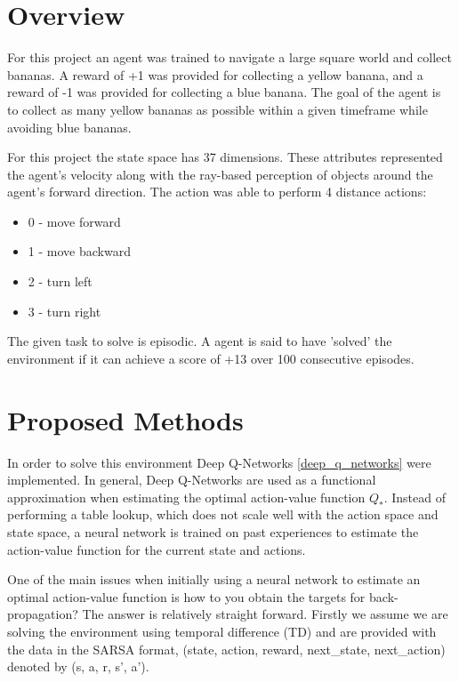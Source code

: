 \documentclass[12pt]{article}
\begin{document}
\maketitle

\section{Overview}
For this project an agent was trained to navigate a large square world and collect bananas.
A reward of +1 was provided for collecting a yellow banana, and a reward of -1 was provided for collecting a blue banana.
The goal of the agent is to collect as many yellow bananas as possible within a given timeframe while avoiding blue bananas.

For this project the state space has 37 dimensions. These attributes represented the agent's velocity along with the ray-based perception
of objects around the agent's forward direction.
The action was able to perform 4 distance actions:

\begin{itemize}
\item 0 - move forward
\item 1 - move backward
\item 2 - turn left
\item 3 - turn right
\end{itemize}

The given task to solve is episodic. 
A agent is said to have 'solved' the environment if it can achieve a score of +13 over 100 consecutive episodes.

\section{Proposed Methods}
\label{methods}
In order to solve this environment Deep Q-Networks \ref{deep_q_networks} were implemented.
In general, Deep Q-Networks are used as a functional approximation  when estimating the optimal action-value function $Q_*$.
Instead of performing a table lookup, which does not scale well with the action space and state space, a neural network is trained
on past experiences to estimate the action-value function for the current state and actions.

One of the main issues when initially using a neural network to estimate an optimal action-value function 
is how to you obtain the targets for back-propagation?
The answer is relatively straight forward.
Firstly we assume we are solving the environment using temporal difference (TD) and are provided with the data in 
the SARSA format, (state, action, reward, next\_state, next\_action) denoted by (s, a, r, s', a').
\end{document}
